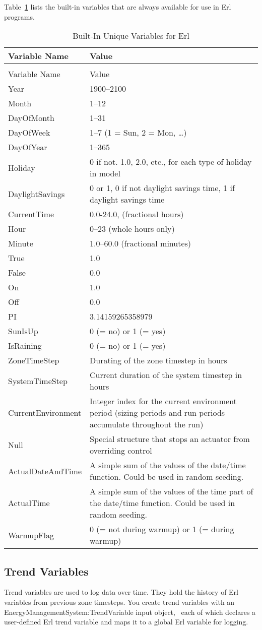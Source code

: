 Table~\ref{table:built-in-unique-variables-for-erl} lists the built-in variables that are always available for use in Erl programs.

\begin{longtable}[c]{p{1.5in}p{4.5in}}
\caption{Built-In Unique Variables for Erl \label{table:built-in-unique-variables-for-erl}} \tabularnewline
\toprule 
Variable Name & Value \tabularnewline
\midrule
\endfirsthead

\caption[]{Built-In Unique Variables for Erl} \tabularnewline
\toprule 
Variable Name & Value \tabularnewline
\midrule
\endhead

Year & 1900–2100 \tabularnewline
Month & 1–12 \tabularnewline
DayOfMonth & 1–31 \tabularnewline
DayOfWeek & 1–7 (1 = Sun, 2 = Mon, …) \tabularnewline
DayOfYear & 1–365 \tabularnewline
Holiday & 0 if not. 1.0, 2.0, etc., for each type of holiday in model \tabularnewline
DaylightSavings & 0 or 1, 0 if not daylight savings time, 1 if daylight savings time \tabularnewline
CurrentTime & 0.0-24.0, (fractional hours) \tabularnewline
Hour & 0–23 (whole hours only) \tabularnewline
Minute & 1.0–60.0 (fractional minutes) \tabularnewline
True & 1.0 \tabularnewline
False & 0.0 \tabularnewline
On & 1.0 \tabularnewline
Off & 0.0 \tabularnewline
PI & 3.14159265358979 \tabularnewline
SunIsUp & 0 (= no) or 1 (= yes) \tabularnewline
IsRaining & 0 (= no) or 1 (= yes) \tabularnewline
ZoneTimeStep & Durating of the zone timestep in hours \tabularnewline
SystemTimeStep & Current duration of the system timestep in hours \tabularnewline
CurrentEnvironment & Integer index for the current environment period (sizing periods and run periods accumulate throughout the run) \tabularnewline
Null & Special structure that stops an actuator from overriding control \tabularnewline
ActualDateAndTime & A simple sum of the values of the date/time function. Could be used in random seeding. \tabularnewline
ActualTime & A simple sum of the values of the time part of the date/time function. Could be used in random seeding. \tabularnewline
WarmupFlag & 0 (= not during warmup) or 1 (= during warmup) \tabularnewline
\bottomrule
\end{longtable}

\subsection{Trend Variables}\label{trend-variables}

Trend variables are used to log data over time. They hold the history of Erl variables from previous zone timesteps. You create trend variables with an EnergyManagementSystem:TrendVariable input object,~ each of which declares a user-defined Erl trend variable and maps it to a global Erl variable for logging.

